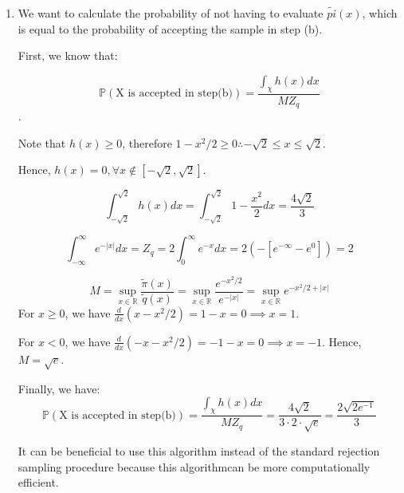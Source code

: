 \documentclass[12pt,letterpaper]{article}
\begin{document}
\begin{enumerate}[leftmargin=!,labelindent=5pt]
	 \item We want to calculate the probability of not having to
	 evaluate $\tilde{pi}(x)$, which is equal to the probability of
	 accepting the sample in step (b).

	 First, we know that:

	$$\mathbb{P}(\text{X is accepted in step(b)}) =
	 \frac{\int_{\chi}h(x)dx}{MZ_q}$$.

	 Note that $h(x) \geq 0$, therefore
	 $1 - x^2/2 \geq 0 \therefore -\sqrt{2} \leq x \leq \sqrt{2}$.

	 Hence, $ h(x) = 0, \forall x \notin [-\sqrt{2},\sqrt{2}]$.

	 $$\int_{-\sqrt2}^{\sqrt2}h(x)dx=
	 \int_{-\sqrt2}^{\sqrt2}1-\frac{x^2}{2}dx = \frac{4\sqrt2}{3}$$

	 $$\int_{-\infty}^{\infty}e^{-|x|}dx = Z_q =
	 2\int_{0}^{\infty}e^{-x}dx  = 2(-[e^{-\infty} - e^0]) = 2$$

	 $$ M = \sup_{x \in \mathbb{R}}\frac{\tilde{\pi}(x)}{\tilde{q}(x)}
	 = \sup_{x \in \mathbb{R}}\frac{e^{-x^2/2}}{e^{-|x|}}=
	 \sup_{x \in \mathbb{R}}e^{-x^2/2 + |x|}$$
	 For $x \geq 0$, we have $\frac{d}{dx}(x-x^2/2)= 1 - x = 0
	  \implies x = 1$.

	 For $x < 0$, we have $\frac{d}{dx}(-x-x^2/2)= -1 - x = 0
	 \implies x = -1$. Hence, $M = \sqrt e$.

	 Finally, we have:
	$$\mathbb{P}(\text{X is accepted in step(b)}) =
	 \frac{\int_{\chi}h(x)dx}{MZ_q} =
	 \frac{4\sqrt2}{3\cdot 2 \cdot \sqrt e} = \frac{2\sqrt{2e^{-1}}}{3}$$

	 It can be beneficial to use this algorithm instead of the standard
	 rejection sampling procedure because this algorithmcan be more
	 computationally efficient.

\end{enumerate}

\newpage
\end{document}
